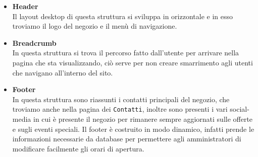 	\begin{itemize}
		\item \textbf{Header}\\Il layout desktop di questa struttura si sviluppa in orizzontale e in esso troviamo il logo del negozio e il menù di navigazione. 
		\item \textbf{Breadcrumb}\\In questa struttura si trova il percorso fatto dall'utente per arrivare nella pagina che sta visualizzando, ciò serve per non creare smarrimento agli utenti che navigano all'interno del sito.
		\item \textbf{Footer}\\In questa struttura sono riassunti i contatti principali del negozio, che troviamo anche nella pagina dei \texttt{Contatti}, inoltre sono presenti i vari social-media in cui è presente il negozio per rimanere sempre aggiornati sulle offerte e sugli eventi speciali. Il footer è costruito in modo dinamico, infatti prende le informazioni necessarie da database per permettere agli amministratori di modificare facilmente gli orari di apertura.
 	\end{itemize}
 		

